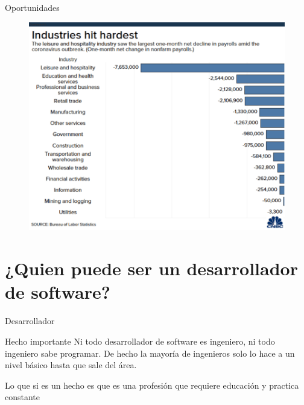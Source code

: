 \documentclass[aspectratio=169]{beamer}
\begin{document}
\begin{frame}{Oportunidades}

            \begin{figure}
                \centering
                \includegraphics[width=0.7\linewidth]{Images/jobs}
            \end{figure}
\end{frame}


{
	\section{¿Quien puede ser un desarrollador de software?}
}





\begin{frame}{Desarrollador}
    \begin{alertblock}{Hecho importante}
    Ni todo desarrollador de software es ingeniero, ni todo ingeniero sabe programar. De hecho la mayoría de ingenieros solo lo hace a un nivel básico hasta que sale del área.
    \end{alertblock}
    Lo que si es un hecho es que es una profesión que requiere educación y practica constante
\end{frame}
\end{document}
